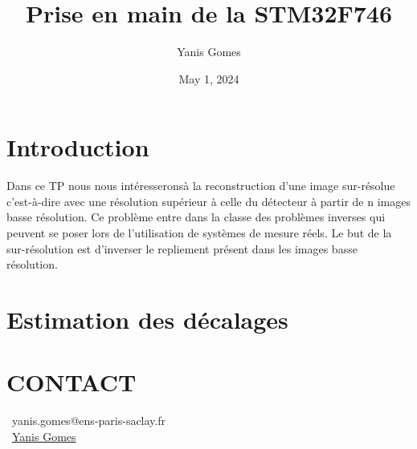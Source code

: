 \documentclass[9pt,a4paper,twoside]{rho}
\title{Prise en main de la STM32F746}
\author[1,$\dagger$]{Yanis Gomes}
\affil[1]{Ecole Normale Supériure de Paris-Saclay}
\date{May 1, 2024} %
\begin{document}
    \maketitle
    \thispagestyle{firststyle}



\section*{Introduction}
Dans ce TP nous nous intéresseronsà la reconstruction d'une image sur-résolue c'est-à-dire avec une résolution supérieur à celle du détecteur à partir de n images basse résolution.
Ce problème entre dans la classe des problèmes inverses qui peuvent se poser lors de l'utilisation de systèmes de mesure réels.
Le but de la sur-résolution est d'inverser le repliement présent dans les images basse résolution.

\section*{Estimation des décalages}

\section*{CONTACT}
    \faEnvelope[regular]\ yanis.gomes@ens-paris-saclay.fr \\
    \faLinkedin\ \href{https://www.linkedin.com/in/yanis-gomes-zbairi/}{Yanis Gomes}
\end{document}
